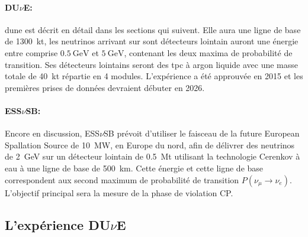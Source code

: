            \paragraph{\texorpdfstring{DU$\nu$E}{DUNE}\cite{Acciarri2016}:} \gls{dune} est décrit en détail dans les sections qui suivent. Elle aura une ligne de base de \SI{1300}{\kilo\tonne}, les neutrinos arrivant sur sont détecteurs lointain auront une énergie entre comprise $\SI{0.5}{\giga\electronvolt}$ et $\SI{5}{\giga\electronvolt}$, contenant les deux maxima de probabilité de transition. Ses détecteurs lointains seront des \gls{tpc} à argon liquide avec une masse totale de \SI{40}{\kilo\tonne} répartie en 4 modules. L'expérience a été approuvée en 2015 et les premières prises de données devraient débuter en 2026.
            
            \paragraph{\texorpdfstring{ESS$\nu$SB}{ESSnuSB}\cite{essnusb}:} Encore en discussion, ESS$\nu$SB prévoit d'utiliser le faisceau de la future European Spallation Source de \SI{10}{\mega\watt}, en Europe du nord, afin de délivrer des neutrinos de \SI{2}{\giga\electronvolt} sur un détecteur lointain de \SI{0.5}{\mega\tonne} utilisant la technologie Cerenkov à eau à une ligne de base de \SI{500}{\kilo\meter}. Cette énergie et cette ligne de base correspondent aux second maximum de probabilité de transition $P(\nu_{\mu}\to\nu_e)$. L'objectif principal sera la mesure de la phase de violation CP.
    
	    \subsection{L'expérience \texorpdfstring{DU$\nu$E}{DUNE}}\label{sec::dune}
    
%                    

